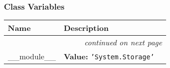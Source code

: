 
  \subsubsection{Class Variables}

    \vspace{-1cm}
\hspace{\varindent}\begin{longtable}{|p{\varnamewidth}|p{\vardescrwidth}|l}
\cline{1-2}
\cline{1-2} \centering \textbf{Name} & \centering \textbf{Description}& \\
\cline{1-2}
\endhead\cline{1-2}\multicolumn{3}{r}{\small\textit{continued on next page}}\\\endfoot\cline{1-2}
\endlastfoot\raggedright \_\-\_\-m\-o\-d\-u\-l\-e\-\_\-\_\- & \raggedright \textbf{Value:} 
{\tt 'System.Storage'}&\\
\cline{1-2}
\end{longtable}

